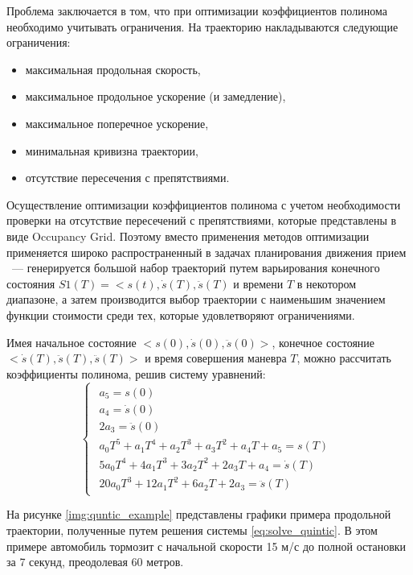 Проблема заключается в том, что при оптимизации коэффициентов полинома необходимо учитывать ограничения. На траекторию
накладываются следующие ограничения:
\begin{itemize}
      \item максимальная продольная скорость,
      \item максимальное продольное ускорение (и замедление),
      \item максимальное поперечное ускорение,
      \item минимальная кривизна траектории,
      \item отсутствие пересечения с препятствиями.
\end{itemize}

Осуществление оптимизации коэффициентов полинома с учетом необходимости проверки на отсутствие пересечений с
препятствиями, которые представлены в виде Occupancy Grid. Поэтому вместо применения методов оптимизации применяется
широко распространенный в задачах планирования движения прием ~--- генерируется большой набор траекторий путем
варьирования конечного состояния $S1(T) = <s(t), \dot{s}(T), \ddot{s}(T)$ и времени $T$ в некотором диапазоне, а затем
производится выбор траектории с наименьшим значением функции стоимости среди тех, которые удовлетворяют ограничениями.

Имея начальное состояние $<s(0), \dot{s}(0), \ddot{s}(0)>$, конечное состояние $<\dot{s}(T), \ddot{s}(T), \ddot{s}(T)>$
и время совершения маневра $T$, можно рассчитать коэффициенты полинома, решив систему уравнений:
\begin{equation}
      \label{eq:solve_quintic}
      \begin{cases}
            \begin{array}
                  {lcl} a_5 = s(0) \\
                        a_4 = \dot{s}(0) \\
                        2a_3 = \ddot{s}(0) \\
                        a_0T^5   + a_1T^4 + a_2T^3 + a_3T^2 + a_4T + a_5 = s(T) \\
                        5a_0T^4  + 4a_1T^3 + 3a_2T^2 + 2a_3T + a_4 = \dot{s}(T)\\
                        20a_0T^3 + 12a_1T^2 + 6a_2T + 2a_3 = \ddot{s}(T)
            \end{array}
      \end{cases}
\end{equation}

На рисунке \ref{img:quntic_example} представлены графики примера продольной траектории, полученные путем решения
системы \ref{eq:solve_quintic}. В этом примере автомобиль тормозит с начальной скорости 15 м/с до полной остановки
за 7 секунд, преодолевая 60 метров.


